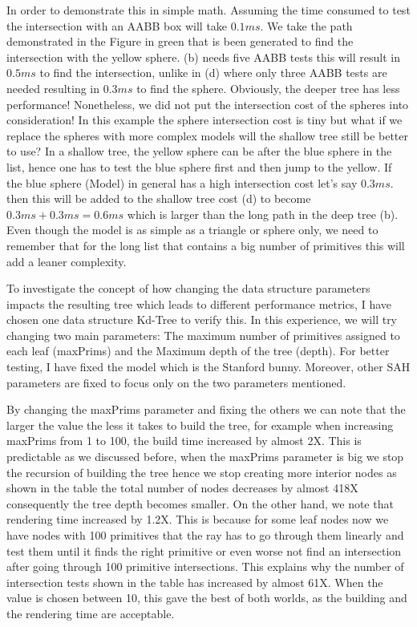 \documentclass[11pt,a4paper]{article}
\begin{document}
In order to demonstrate this in simple math. Assuming the time consumed to test the intersection with an AABB box will take $0.1ms$. We take the path demonstrated in the Figure in green that is been generated to find the intersection with the yellow sphere. (b) needs five AABB tests this will result in $0.5ms$ to find the intersection, unlike in (d) where only three AABB tests are needed resulting in $0.3ms$ to find the sphere. Obviously, the deeper tree has less performance! Nonetheless, we did not put the intersection cost of the spheres into consideration! In this example the sphere intersection cost is tiny but what if we replace the spheres with more complex models will the shallow tree still be better to use? In a shallow tree, the yellow sphere can be after the blue sphere in the list, hence one has to test the blue sphere first and then jump to the yellow. If the blue sphere (Model) in general has a high intersection cost let's say $0.3ms$. then this will be added to the shallow tree cost (d) to become $0.3ms + 0.3ms = 0.6ms$ which is larger than the long path in the deep tree (b). Even though the model is as simple as a triangle or sphere only, we need to remember that for the long list that contains a big number of primitives this will add a leaner complexity.
\\
\noindent

To investigate the concept of how changing the data structure parameters impacts the resulting tree which leads to different performance metrics, I have chosen one data structure Kd-Tree to verify this. In this experience, we will try changing two main parameters: The maximum number of primitives assigned to each leaf (maxPrims) and the Maximum depth of the tree (depth). For better testing, I have fixed the model which is the Stanford bunny. Moreover, other SAH parameters are fixed to focus only on the two parameters mentioned. 
\\
\noindent

By changing the maxPrims parameter and fixing the others we can note that the larger the value the less it takes to build the tree, for example when increasing maxPrims from  1 to 100, the build time increased by almost 2X. This is predictable as we discussed before, when the maxPrims parameter is big we stop the recursion of building the tree hence we stop creating more interior nodes as shown in the table the total number of nodes decreases by almost 418X consequently the tree depth becomes smaller. On the other hand, we note that rendering time increased by 1.2X. This is because for some leaf nodes now we have nodes with 100 primitives that the ray has to go through them linearly and test them until it finds the right primitive or even worse not find an intersection after going through 100 primitive intersections. This explains why the number of intersection tests shown in the table has increased by almost  61X. When the value is chosen between 10, this gave the best of both worlds, as the building and the rendering time are acceptable. 
\end{document}
